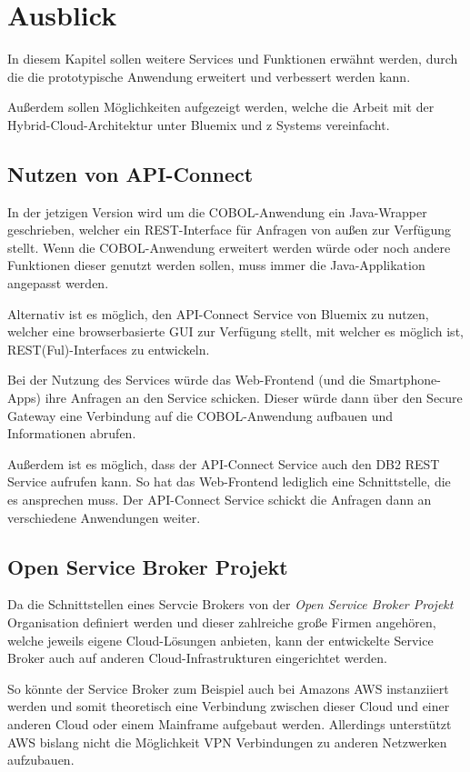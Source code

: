 \chapter{Ausblick}
\label{cha:ausblick}
In diesem Kapitel sollen weitere Services und Funktionen erwähnt werden, durch die die prototypische Anwendung erweitert
und verbessert werden kann.

Außerdem sollen Möglichkeiten aufgezeigt werden, welche die Arbeit mit der Hybrid-Cloud-Architektur unter Bluemix
und z Systems vereinfacht.

\section{Nutzen von API-Connect}
In der jetzigen Version wird um die COBOL-Anwendung ein Java-Wrapper geschrieben, welcher ein REST-Interface für Anfragen
von außen zur Verfügung stellt. Wenn die COBOL-Anwendung erweitert werden würde oder noch andere Funktionen dieser genutzt
werden sollen, muss immer die Java-Applikation angepasst werden.

Alternativ ist es möglich, den API-Connect Service von Bluemix zu nutzen, welcher eine browserbasierte GUI zur Verfügung
stellt, mit welcher es möglich ist, REST(Ful)-Interfaces zu entwickeln.

Bei der Nutzung des Services würde das Web-Frontend (und die Smartphone-Apps) ihre Anfragen an den Service schicken. Dieser
würde dann über den Secure Gateway eine Verbindung auf die COBOL-Anwendung aufbauen und Informationen abrufen.

Außerdem ist es möglich, dass der API-Connect Service auch den DB2 REST Service aufrufen kann. So hat das Web-Frontend
lediglich eine Schnittstelle, die es ansprechen muss. Der API-Connect Service schickt die Anfragen dann an verschiedene
Anwendungen weiter.

\section{Open Service Broker Projekt}
Da die Schnittstellen eines Servcie Brokers von der \textit{Open Service Broker Projekt} Organisation definiert werden und
dieser zahlreiche große Firmen angehören, welche jeweils eigene Cloud-Lösungen anbieten, kann der entwickelte Service
Broker auch auf anderen Cloud-Infrastrukturen eingerichtet werden.

So könnte der Service Broker zum Beispiel auch bei Amazons AWS instanziiert werden und somit theoretisch eine Verbindung
zwischen dieser Cloud und einer anderen Cloud oder einem Mainframe aufgebaut werden. Allerdings unterstützt AWS bislang
nicht die Möglichkeit VPN Verbindungen zu anderen Netzwerken aufzubauen.

